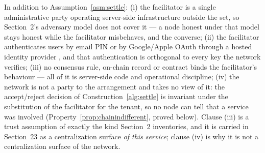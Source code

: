 \label{sec:paying:facilitator}

\begin{assumption}
\label{asm:custodial}
In addition to Assumption~\ref{asm:settle}: (i) the facilitator is a single administrative party
operating server-side infrastructure outside the \FluxNode set, so Section~2's adversary model does
not cover it --- a node honest under that model stays honest while the facilitator misbehaves, and
the converse; (ii) the facilitator authenticates users by email PIN or by Google/Apple OAuth through
a hosted identity provider 
, and that authentication is orthogonal to
every key the network verifies; (iii) no consensus rule, on-chain record or contract binds the
facilitator's behaviour --- all of it is server-side code and operational discipline; (iv) the
network is not a party to the arrangement and takes no view of it: the accept/reject decision of
Construction~\ref{alg:settle} is invariant under the substitution of the facilitator for the tenant,
so no node can tell that a service was involved (Property~\ref{prop:chainindifferent}, proved below).
Clause (iii) is a trust assumption of exactly the kind Section~2 inventories, and it is carried in
Section~23 as a centralization surface \emph{of this service}; clause (iv) is why it is not a
centralization surface of the network.
\end{assumption}

